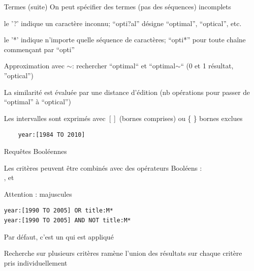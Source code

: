 \begin{frame}[fragile]{Termes (suite)}
  On peut spécifier des termes (pas des séquences) incomplets
  \begin{redbullet}
      \setlength{\itemsep}{8pt}
    \item le '?' indique un caractère inconnu;  ``opti?al'' désigne ``optimal'', ``optical'', etc.
      
    \item le '*' indique n'importe quelle séquence de caractères; 
      ``opti*'' pour toute chaîne commençant par ``opti''
    \item Approximation avec $\sim$: rechercher ``optimal`` et ``optimal$\sim$`` (0 et 1 résultat, ''optical'')
    
       La similarité est évaluée par une distance d'édition 
      (nb opérations pour passer de ``optimal'' à ``optical'')
  
    \item Les intervalles sont exprimés avec  $[ ]$ (bornes comprises) ou  \{ \} bornes exclues
  \end{redbullet}
\begin{verbatim}
    year:[1984 TO 2010]
\end{verbatim}
\end{frame}

\begin{frame}[fragile]{Requêtes Booléennes}

  \begin{redbullet}
    \item Les critères peuvent être combinés avec des \alert{opérateurs
      Booléens} :\\
      ,  et 
    \item Attention : majuscules
  \end{redbullet}
\begin{verbatim}
year:[1990 TO 2005] OR title:M*
year:[1990 TO 2005] AND NOT title:M*
\end{verbatim}
   
\begin{redbullet}
  \item Par défaut, c'est un  qui est appliqué
  \item Recherche sur plusieurs critères ramène l'union des résultats sur chaque
    critère pris individuellement
\end{redbullet}
\end{frame}

